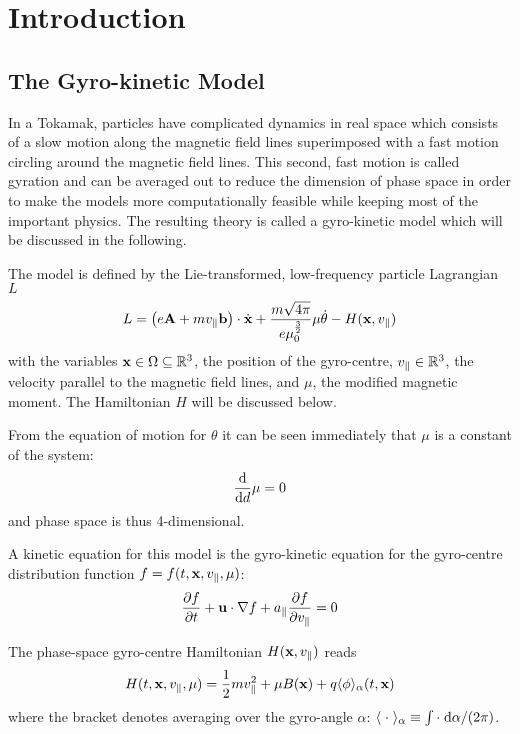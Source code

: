 
\section{Introduction}
\label{sec:introduction}
\subsection{The Gyro-kinetic Model}

In a Tokamak, particles have complicated dynamics in real space which consists of a slow motion along the magnetic field lines superimposed with a fast motion circling around the magnetic field lines. This second, fast motion is called gyration and can be averaged out to reduce the dimension of phase space in order to make the models more computationally feasible while keeping most of the important physics. The resulting theory is called a gyro-kinetic model which will be discussed in the following.

The model is defined by the Lie-transformed, low-frequency particle Lagrangian $L$ \cite{Bottino_Sonnendrucker_2015}
\begin{equation}\label{Lagrangian}
	L = \left(e\mathbf{A} + m v_\parallel \mathbf{b} \right)\cdot\dot{\mathbf{x}} + \frac{m\sqrt{4\pi}}{e \mu_0^{\frac{3}{2}}} \mu \dot{\theta} - H(\mathbf{x}, v_\parallel)
\end{equation}
with the variables $\mathbf{x} \in \Omega \subseteq \mathbb{R}^3$, the position of the gyro-centre, $v_\parallel \in \mathbb{R}^3$, the velocity parallel to the magnetic field lines, and $\mu$, the modified magnetic moment. The Hamiltonian $H$ will be discussed below.


From the equation of motion for $\theta$ it can be seen immediately that $\mu$ is a constant of the system:
\begin{equation}
	\frac{\text{d} }{\text{d} d} \mu = 0
\end{equation}
and phase space is thus 4-dimensional.

A kinetic equation for this model is the gyro-kinetic equation for the gyro-centre distribution function $f=f(t,\mathbf{x}, v_\parallel, \mu)$:
\begin{equation}\label{drift-kinetic model}
	\frac{\partial f}{\partial t} + \mathbf{u} \cdot \nabla f + a_\parallel \frac{\partial f}{\partial v_\parallel} = 0
\end{equation}

The phase-space gyro-centre Hamiltonian $H(\mathbf{x}, v_\parallel)$ reads
\begin{equation}
	H(t, \mathbf{x}, v_\parallel, \mu) = \frac{1}{2} m v_\parallel^2 + \mu B(\mathbf{x}) + q \langle \phi \rangle_\alpha (t,\mathbf{x})
\end{equation}
where the bracket denotes averaging over the gyro-angle $\alpha$: $\langle \;\cdot\; \rangle_\alpha \equiv \int \cdot\;\text{d} \alpha / (2\pi)$.

